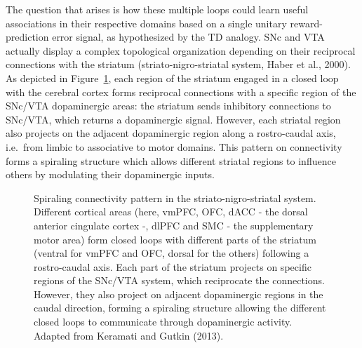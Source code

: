 \documentclass[
  11pt,
  a4paper,
]{scrbook}
\begin{document}
The question that arises is how these multiple loops could learn useful
associations in their respective domains based on a single unitary
reward-prediction error signal, as hypothesized by the TD analogy. SNc
and VTA actually display a complex topological organization depending on
their reciprocal connections with the striatum (striato-nigro-striatal
system, Haber et al., 2000). As depicted in
Figure~\ref{fig-intro:daloops}, each region of the striatum engaged in a
closed loop with the cerebral cortex forms reciprocal connections with a
specific region of the SNc/VTA dopaminergic areas: the striatum sends
inhibitory connections to SNc/VTA, which returns a dopaminergic signal.
However, each striatal region also projects on the adjacent dopaminergic
region along a rostro-caudal axis, i.e.~from limbic to associative to
motor domains. This pattern on connectivity forms a spiraling structure
which allows different striatal regions to influence others by
modulating their dopaminergic inputs.

\begin{figure}


\caption{\label{fig-intro:daloops}Spiraling connectivity pattern in the
striato-nigro-striatal system. Different cortical areas (here, vmPFC,
OFC, dACC - the dorsal anterior cingulate cortex -, dlPFC and SMC - the
supplementary motor area) form closed loops with different parts of the
striatum (ventral for vmPFC and OFC, dorsal for the others) following a
rostro-caudal axis. Each part of the striatum projects on specific
regions of the SNc/VTA system, which reciprocate the connections.
However, they also project on adjacent dopaminergic regions in the
caudal direction, forming a spiraling structure allowing the different
closed loops to communicate through dopaminergic activity. Adapted from
Keramati and Gutkin (2013).}

\end{figure}%
\end{document}
